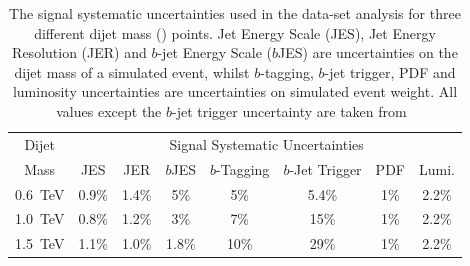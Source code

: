 \begin{table}[!htb]
  \centering
  \begin{tabular}{|c||c|c|c|c|c|c|c|}
    \hline
    Dijet   & \multicolumn{7}{c|}{Signal Systematic Uncertainties}                    \\ \cline{2-8} 
    Mass    & JES   & JER   & $b$JES  & $b$-Tagging & $b$-Jet Trigger & PDF & Lumi.        \\
    \hline                                                                        
    0.6~TeV & 0.9\% & 1.4\% & 5\%     &     5\%     &      5.4\%   & 1\% & 2.2\%       \\
    1.0~TeV & 0.8\% & 1.2\% & 3\%     &     7\%     &       15\%   & 1\% & 2.2\%       \\
    1.5~TeV & 1.1\% & 1.0\% & 1.8\%    &    10\%     &       29\%   & 1\% & 2.2\%       \\
    \hline
  \end{tabular}
  \caption[The signal systematic uncertainties used in the \lm{} data-set analysis.]
          {The signal systematic uncertainties used in the \lm{} data-set analysis
           for three different dijet mass (\mjj{}) points.
          Jet Energy Scale (JES), Jet Energy Resolution (JER) and $b$-jet Energy Scale ($b$JES)
          are uncertainties on the dijet mass of a simulated event,
          whilst $b$-tagging, $b$-jet trigger, PDF and luminosity uncertainties are uncertainties on simulated event weight.
          All values except the $b$-jet trigger uncertainty are taken from~\cite{dibjet-full_int}}
  \label{tab:lim-lowmass_syst}
  \end{table}

